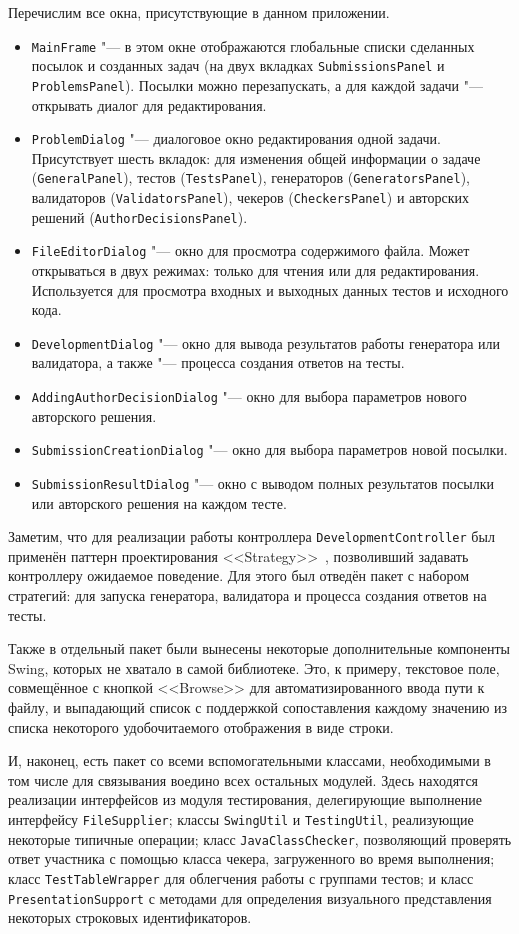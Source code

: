 Перечислим все окна, присутствующие в данном приложении.

\begin{itemize}
\item \texttt{MainFrame} "--- в этом окне отображаются глобальные списки сделанных посылок и созданных задач (на двух вкладках \texttt{Submissions\-Panel} и \texttt{Problems\-Panel}). Посылки можно перезапускать, а для каждой задачи "--- открывать диалог для редактирования. 
\item \texttt{ProblemDialog} "--- диалоговое окно редактирования одной задачи. Присутствует шесть вкладок: для изменения общей информации о задаче (\texttt{General\-Panel}), тестов (\texttt{Tests\-Panel}), генераторов (\texttt{Generators\-Panel}), валидаторов (\texttt{Validators\-Panel}), чекеров (\texttt{Checkers\-Panel}) и авторских решений (\texttt{Author\-Decisions\-Panel}).
\item \texttt{FileEditorDialog} "--- окно для просмотра содержимого файла. Может открываться в двух режимах: только для чтения или для редактирования. Используется для просмотра входных и выходных данных тестов и исходного кода.
\item \texttt{DevelopmentDialog} "--- окно для вывода результатов работы генератора или валидатора, а также "--- процесса создания ответов на тесты.
\item \texttt{AddingAuthorDecisionDialog} "--- окно для выбора параметров нового авторского решения.
\item \texttt{SubmissionCreationDialog} "--- окно для выбора параметров новой посылки.
\item \texttt{SubmissionResultDialog} "--- окно с выводом полных результатов посылки или авторского решения на каждом тесте.
\end{itemize}

Заметим, что для реализации работы контроллера \texttt{Development\-Controller} был применён паттерн проектирования <<Strategy>>~\cite{gamma}, позволивший задавать контроллеру ожидаемое поведение. Для этого был отведён пакет с набором стратегий: для запуска генератора, валидатора и процесса создания ответов на тесты.

Также в отдельный пакет были вынесены некоторые дополнительные компоненты Swing, которых не хватало в самой библиотеке. Это, к примеру, текстовое поле, совмещённое с кнопкой <<Browse>> для автоматизированного ввода пути к файлу, и выпадающий список с поддержкой сопоставления каждому значению из списка некоторого удобочитаемого отображения в виде строки.

И, наконец, есть пакет со всеми вспомогательными классами, необходимыми в том числе для связывания воедино всех остальных модулей. Здесь находятся реализации интерфейсов из модуля тестирования, делегирующие выполнение интерфейсу \texttt{File\-Supplier}; классы \texttt{Swing\-Util} и \texttt{Testing\-Util}, реализующие некоторые типичные операции; класс \texttt{Java\-Class\-Checker}, позволяющий проверять ответ участника с помощью класса чекера, загруженного во время выполнения; класс \texttt{Test\-Table\-Wrapper} для облегчения работы с группами тестов; и класс \texttt{Presentation\-Support} с методами для определения визуального представления некоторых строковых идентификаторов.